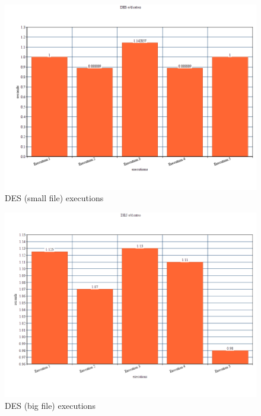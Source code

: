 \documentclass{article}
\begin{document}
	\begin{figure}[h]
		\includegraphics[width=1\textwidth ]{images/DES_ed.png}
		\centering
		\caption{DES (small file) executions}
	\end{figure}
	
	\begin{figure}[h]
		\includegraphics[width=1\textwidth ]{images/DES(big).png}
		\centering
		\caption{DES (big file) executions}
	\end{figure}
	
\end{document}
